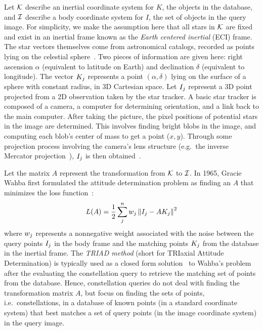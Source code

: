 Let $\mathcal{K}$ describe an inertial coordinate system for $K$, the objects in the database, and $\mathcal{I}$ describe a
body coordinate system for $I$, the set of objects in the query image.
For simplicity, we make the assumption here that all stars in $\mathcal{K}$ are fixed and exist in an inertial frame known
as the \textit{Earth centered inertial} (ECI) frame.
The star vectors themselves come from astronomical catalogs, recorded as points lying on the celestial
sphere~\cite{tappe:starTrackerDevelopment}.
Two pieces of information are given here: right ascension $\alpha$ (equivalent to latitude on Earth) and
declination $\delta$ (equivalent to longitude).
The vector $K_j$ represents a point $\left( \alpha, \delta \right)$ lying on the surface of a sphere with constant radius,
in 3D Cartesian space.
Let $I_j$ represent a 3D point projected from a 2D observation taken by the star tracker.
A basic star tracker is composed of a camera, a computer for determining orientation, and a link back to the main
computer.
After taking the picture, the pixel positions of potential stars in the image are determined.
This involves finding bright blobs in the image, and computing each blob's center of mass to get a point ($x, y$).
Through some projection process involving the camera's lens structure (e.g.\ the
inverse Mercator projection~\cite{weisstein:mercator}), $I_j$ is then obtained~\cite{tappe:starTrackerDevelopment}.

Let the matrix $A$ represent the transformation from $\mathcal{K}$ to $\mathcal{I}$.
In 1965, Gracie Wahba first formulated the attitude determination
problem as finding an $A$ that minimizes the loss function~\cite{wahba:attitudeEstimationProblem}:
\begin{equation}
    L(A) = \frac{1}{2} \sum_j^n w_j \left\| I_j - AK_j \right\|^2
\end{equation}
where $w_j$ represents a nonnegative weight associated with the noise between the query points $I_j$ in the
body frame and the matching points $K_j$ from the database in the inertial frame.
The \textit{TRIAD method} (short for TRIaxial Attitude Determination) is typically used as a closed form
solution~\cite{markley:attitudeDeterminationTwoVectors} to Wahba's problem after the evaluating the constellation query
to retrieve the matching set of points from the database.
Hence, constellation queries do not deal with finding the transformation matrix $A$, but focus on finding the sets of
points, i.e.\ constellations, in a database of known points (in a standard coordinate system) that best matches a set
of query points (in the image coordinate system) in the query image.

